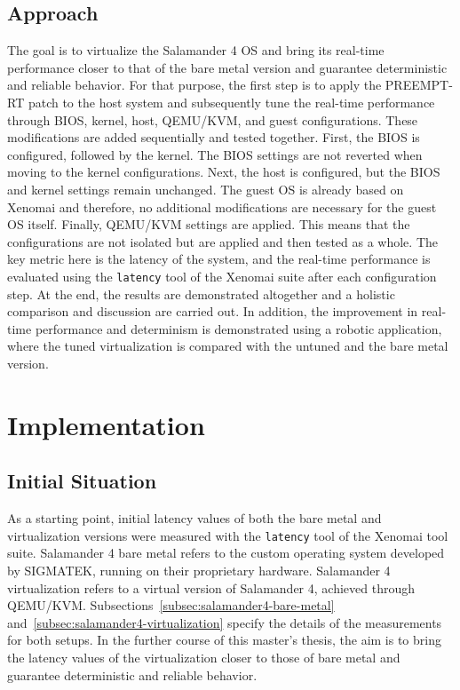\documentclass[MMR,Master,english]{style/twbook}
\begin{document}
\section{Approach}\label{sec:approach}
The goal is to virtualize the Salamander 4 OS and bring its real-time performance closer to that of the bare metal version and guarantee deterministic and reliable behavior. For that purpose, the first step is to apply the PREEMPT-RT patch to the host system and subsequently tune the real-time performance through BIOS, kernel, host, QEMU/KVM, and guest configurations. These modifications are added sequentially and tested together. First, the BIOS is configured, followed by the kernel. The BIOS settings are not reverted when moving to the kernel configurations. Next, the host is configured, but the BIOS and kernel settings remain unchanged. The guest OS is already based on Xenomai and therefore, no additional modifications are necessary for the guest OS itself. Finally, QEMU/KVM settings are applied. This means that the configurations are not isolated but are applied and then tested as a whole. The key metric here is the latency of the system, and the real-time performance is evaluated using the \texttt{latency} tool of the Xenomai suite after each configuration step. At the end, the results are demonstrated altogether and a holistic comparison and discussion are carried out. In addition, the improvement in real-time performance and determinism is demonstrated using a robotic application, where the tuned virtualization is compared with the untuned and the bare metal version.

\clearpage

\chapter{Implementation}

\section{Initial Situation}\label{sec:starting_situation}
As a starting point, initial latency values of both the bare metal and virtualization versions were measured with the \texttt{latency} tool of the Xenomai tool suite. Salamander 4 bare metal refers to the custom operating system developed by SIGMATEK, running on their proprietary hardware. Salamander 4 virtualization refers to a virtual version of Salamander 4, achieved through QEMU/KVM. Subsections~\ref{subsec:salamander4-bare-metal} and~\ref{subsec:salamander4-virtualization} specify the details of the measurements for both setups. In the further course of this master's thesis, the aim is to bring the latency values of the virtualization closer to those of bare metal and guarantee deterministic and reliable behavior.
\end{document}
